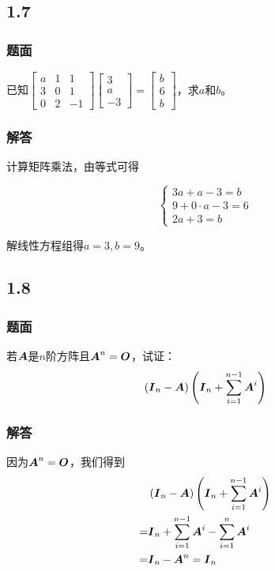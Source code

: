 \documentclass[9pt,xcolor=svgnames]{beamer} %
\begin{document}
\subsection*{1.7}
\begin{frame}
    \frametitle{题面}
    已知\(\begin{bmatrix}a&1&1\\3&0&1\\0&2&-1\end{bmatrix}\begin{bmatrix}3\\a\\-3\end{bmatrix}=\begin{bmatrix}b\\6\\b\end{bmatrix}\)，求\(a\)和\(b\)。
\end{frame}
\begin{frame}
    \frametitle{解答}
    计算矩阵乘法，由等式可得

    \begin{equation*}
        \begin{cases}
            3a+a-3=b       \\
            9+0\cdot a-3=6 \\
            2a+3=b
        \end{cases}
    \end{equation*}

    解线性方程组得\(a=3,b=9\)。
\end{frame}

\subsection*{1.8}
\begin{frame}
    \frametitle{题面}
    若\(\boldsymbol{A}\)是\(n\)阶方阵且\(\boldsymbol{A}^n=\boldsymbol{O}\)，试证：
    \begin{equation*}
        \left( \boldsymbol{I}_n-\boldsymbol{A} \right)\left( \boldsymbol{I}_n+\sum_{i=1}^{n-1}\boldsymbol{A}^i \right)
    \end{equation*}
\end{frame}
\begin{frame}
    \frametitle{解答}
    因为\(\boldsymbol{A}^n=\boldsymbol{O}\)，我们得到
    \begin{align*}
          & \left( \boldsymbol{I}_n-\boldsymbol{A} \right)\left( \boldsymbol{I}_n+\sum_{i=1}^{n-1}\boldsymbol{A}^i \right) \\
        = & \boldsymbol{I}_n+\sum_{i=1}^{n-1}\boldsymbol{A}^i-\sum_{i=1}^n\boldsymbol{A}^i        \\
        = & \boldsymbol{I}_n-\boldsymbol{A}^n=\boldsymbol{I}_n
    \end{align*}
\end{frame}
\end{document}
